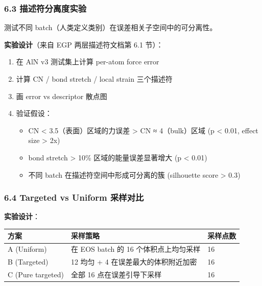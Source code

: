 \documentclass[
  12pt,
]{ctexart}
\providecommand{\tightlist}{%
  \setlength{\itemsep}{0pt}\setlength{\parskip}{0pt}}
\begin{document}
\subsubsection{6.3
描述符分离度实验}\label{ux63cfux8ff0ux7b26ux5206ux79bbux5ea6ux5b9eux9a8c}

测试不同 batch（人类定义类别）在误差相关子空间中的可分离性。

\textbf{实验设计}（来自 EGP 两层描述符文档第 6.1 节）：

\begin{enumerate}
\def\labelenumi{\arabic{enumi}.}
\tightlist
\item
  在 AlN v3 测试集上计算 per-atom force error
\item
  计算 CN / bond stretch / local strain 三个描述符
\item
  画 error vs descriptor 散点图
\item
  验证假设：

  \begin{itemize}
  \tightlist
  \item
    CN \textless{} 3.5（表面）区域的力误差 \textgreater{} CN ≈
    4（bulk）区域 (p \textless{} 0.01, effect size \textgreater{} 2x)
  \item
    bond stretch \textgreater{} 10\% 区域的能量误差显著增大 (p
    \textless{} 0.01)
  \item
    不同 batch 在描述符空间中形成可分离的簇 (silhouette score
    \textgreater{} 0.3)
  \end{itemize}
\end{enumerate}

\subsubsection{6.4 Targeted vs Uniform
采样对比}\label{targeted-vs-uniform-ux91c7ux6837ux5bf9ux6bd4}

\textbf{实验设计}：

\begin{longtable}[]{@{}lll@{}}
\toprule\noalign{}
方案 & 采样策略 & 采样点数 \\
\midrule\noalign{}
\endhead
\bottomrule\noalign{}
\endlastfoot
A (Uniform) & 在 EOS batch 的 16 个体积点上均匀采样 & 16 \\
B (Targeted) & 12 均匀 + 4 在误差最大的体积附近加密 & 16 \\
C (Pure targeted) & 全部 16 点在误差引导下采样 & 16 \\
\end{longtable}
\end{document}
